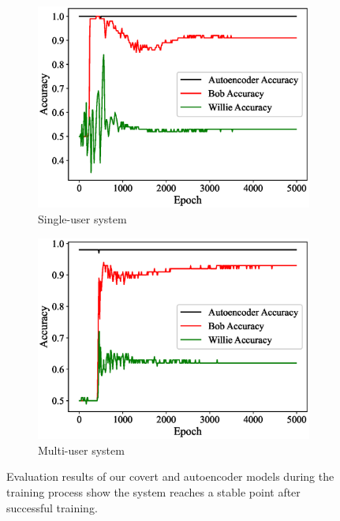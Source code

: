 \begin{figure}[tp!]
	\center
	\begin{subfigure}{0.24\textwidth}
		\includegraphics[width=\linewidth]{figs/training_progress}
		\caption{Single-user system}	
	\end{subfigure}
	\begin{subfigure}{0.24\textwidth}
		\includegraphics[width=\linewidth]{figs/multi_training_progress}
		\caption{Multi-user system}	
	\end{subfigure}
	\caption{Evaluation results of our covert and autoencoder models during the training process show the system reaches a stable point after successful training.}
	\label{fig:traning_progress}
\end{figure}

